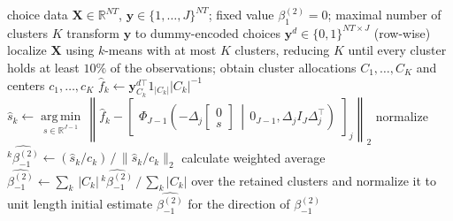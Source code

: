 \documentclass[preprint,12pt,authoryear]{elsarticle}
\newcommand{\R}{\mathbb{R}}
\newcommand{\norm}[1]{\ensuremath{\lVert #1\rVert_2}}
\DeclareMathOperator*{\argmin}{arg\,min}
\begin{document}
\begin{algorithm}[htb]
  \caption{Initial estimates for a single type-II coefficient.}
  \label{alg:type2initsingle}
  \begin{algorithmic}[1]
    \REQUIRE choice data $\bm{X} \in \R^{NT}$, $\bm{y} \in \{1,\dots,J\}^{NT}$; fixed value $\beta^{(2)}_{1} = 0$; maximal number of clusters $K$
    \STATE transform $\bm{y}$ to dummy-encoded choices $\bm{y}^d \in \{0,1\}^{NT \times J}$ (row-wise)
    \STATE localize $\bm{X}$ using $k$-means with at most $K$ clusters, reducing $K$ until every cluster holds at least $10\%$ of the observations; obtain cluster allocations $C_1,\dots,C_K$ and centers $c_1, \dots, c_K$
      \STATE $\hat{f}_k \leftarrow \bm{y}_{C_k}^{d\top} 1_{\lvert C_k \rvert}\lvert C_k \rvert^{-1}$
      \STATE $\hat{s}_k \leftarrow \underset{s \in \R^{J-1}}{\argmin}\,\left\lVert \hat{f}_k - \begin{bmatrix} \Phi_{J-1}\left( -\Delta_{j} \begin{bmatrix} 0 \\ s \end{bmatrix} \,\middle|\, 0_{J-1}, \Delta_{j} I_{J} \Delta_{j}^\top \right) \end{bmatrix}_j \right\rVert_2$ \label{algline:type2opt}
      \STATE normalize $\widehat{{}^{k}_{}\beta_{-1}^{(2)}} \leftarrow (\hat{s}_k / c_k) \,/\, \norm{\hat{s}_k / c_k}$
    \ENDFOR
    \STATE calculate weighted average $\widehat{\beta_{-1}^{(2)}} \leftarrow \sum_k\, \lvert C_k \rvert\, \widehat{{}^{k}_{}\beta_{-1}^{(2)}} \,/\, \sum_k \lvert C_k \rvert$ over the retained clusters and normalize it to unit length
    \ENSURE initial estimate $\widehat{\beta_{-1}^{(2)}}$ for the direction of $\beta_{-1}^{(2)}$
  \end{algorithmic}
\end{algorithm}
\end{document}
